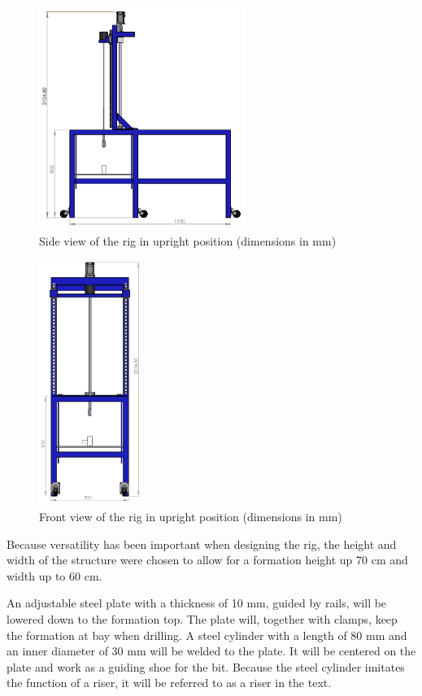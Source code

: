 \begin{figure} [H]
\centering
\includegraphics[width=0.6\textwidth]{figures/Sidedimensions.PNG}
\caption{Side view of the rig in upright position (dimensions in mm)}
\label{fig:SideViewUpDim}
\end{figure}


\begin{figure} [H]
\centering
\includegraphics[width=0.3\textwidth]{figures/FrontDimensions.PNG}
\caption{Front view of the rig in upright position (dimensions in mm)}
\label{fig:FrontView}
\end{figure}


Because versatility has been important when designing the rig, the height and width of the structure were chosen to allow for a formation height up 70 cm and width up to 60 cm.

An adjustable steel plate with a thickness of 10 mm, guided by rails, will be lowered down to the formation top. The plate will, together with clamps, keep the formation at bay when drilling. A steel cylinder with a length of 80 mm and an inner diameter of 30 mm will be welded to the plate. It will be centered on the plate and work as a guiding shoe for the bit. Because the steel cylinder imitates the function of a riser, it will be referred to as a riser in the text.

